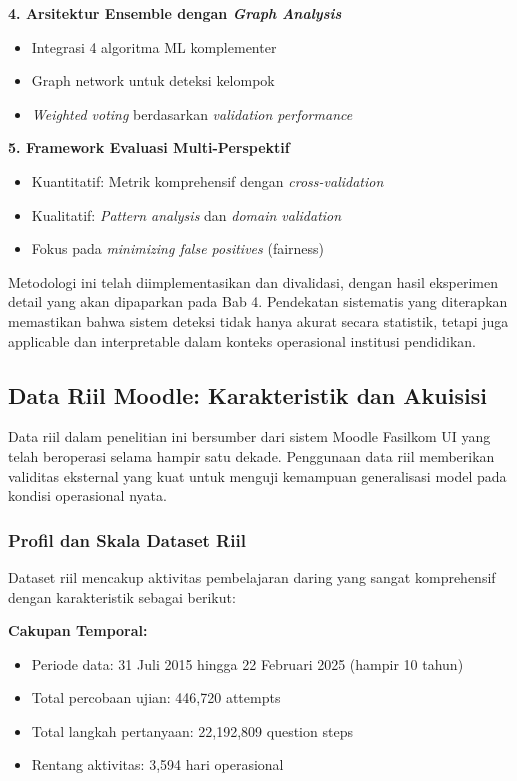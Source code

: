 \textbf{4. Arsitektur Ensemble dengan \textit{Graph Analysis}}
\begin{itemize}
    \item Integrasi 4 algoritma ML komplementer
    \item Graph network untuk deteksi kelompok
    \item \textit{Weighted voting} berdasarkan \textit{validation performance}
\end{itemize}

\textbf{5. Framework Evaluasi Multi-Perspektif}
\begin{itemize}
    \item Kuantitatif: Metrik komprehensif dengan \textit{cross-validation}
    \item Kualitatif: \textit{Pattern analysis} dan \textit{domain validation}
    \item Fokus pada \textit{minimizing false positives} (fairness)
\end{itemize}

Metodologi ini telah diimplementasikan dan divalidasi, dengan hasil eksperimen detail yang akan dipaparkan pada Bab 4. Pendekatan sistematis yang diterapkan memastikan bahwa sistem deteksi tidak hanya akurat secara statistik, tetapi juga applicable dan interpretable dalam konteks operasional institusi pendidikan.

\subsection{Data Riil Moodle: Karakteristik dan Akuisisi}
\label{sec:dataRiilMoodle}

Data riil dalam penelitian ini bersumber dari sistem Moodle Fasilkom UI yang telah beroperasi selama hampir satu dekade. Penggunaan data riil memberikan validitas eksternal yang kuat untuk menguji kemampuan generalisasi model pada kondisi operasional nyata.

\subsubsection{Profil dan Skala Dataset Riil}
\label{sec:profilDatasetRiil}

Dataset riil mencakup aktivitas pembelajaran daring yang sangat komprehensif dengan karakteristik sebagai berikut:

\textbf{Cakupan Temporal:}
\begin{itemize}
    \item Periode data: 31 Juli 2015 hingga 22 Februari 2025 (hampir 10 tahun)
    \item Total percobaan ujian: 446,720 attempts
    \item Total langkah pertanyaan: 22,192,809 question steps
    \item Rentang aktivitas: 3,594 hari operasional
\end{itemize}

